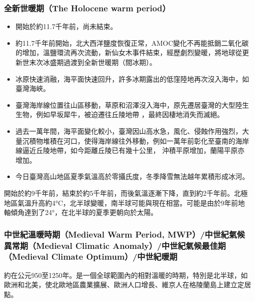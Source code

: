 \documentclass[a4paper,12pt]{report}
\begin{document}
\subsubsection{全新世暖期（The Holocene warm period）}
\begin{itemize}
\item 開始於約11.7千年前，尚未結束。
\item 約11.7千年前開始，北大西洋鹽度恢復正常，AMOC變化不再能抵銷二氧化碳的增加，溫鹽環流再次流動，新仙女木事件結束，經歷劇烈變暖，將地球從更新世末次冰盛期過渡到全新世暖期（間冰期）。
\item 冰原快速消融，海平面快速回升，許多冰期露出的低窪陸地再次沒入海中，如臺灣海峽。
\item 臺灣海岸線位置往山區移動，草原和沼澤沒入海中，原先遷居臺灣的大型陸生生物，例如早坂犀牛，被迫遷往丘陵地帶 ，最終因棲地消失而滅絕。
\item 過去一萬年間，海平面變化較小，臺灣因山高水急，風化、侵蝕作用強烈，大量沉積物堆積在河口，使得海岸線往外移動，例如一萬年前彰化至臺南的海岸線逼近丘陵地帶，如今距離丘陵已有幾十公里， 沖積平原增加，蘭陽平原亦增加。
\item 今日臺灣高山地區夏季氣溫高於零攝氏度，冬季降雪無法越年累積形成冰河。
\end{itemize}
開始於約9千年前，結束於約5千年前，而後氣溫逐漸下降，直到約2千年前。北極地區氣溫升高約4°C，北半球變暖，南半球可能與現在相當。可能是由於9年前地軸傾角達到了24°，在北半球的夏季更朝向於太陽。
\subsubsection{中世紀溫暖時期（Medieval Warm Period, MWP）/中世紀氣候異常期（Medieval Climatic Anomaly）/中世紀氣候最佳期（Medieval Climate Optimum）/中世紀暖期}
約在公元950至1250年。是一個全球範圍內的相對溫暖的時期，特別是北半球，如歐洲和北美，使北歐地區農業擴展、歐洲人口增長、維京人在格陵蘭島上建立定居點。
\end{document}

